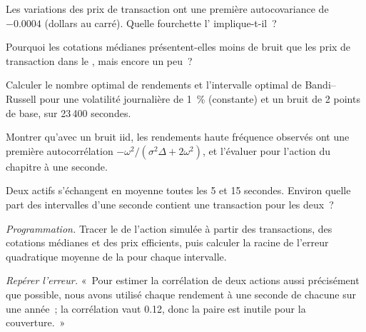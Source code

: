 \begin{exercise}[$\star$]\label{exo:qm:high-frequency-econometrics:2}
Les variations des prix de transaction ont une première autocovariance de $-0.0004$ (dollars au carré). Quelle fourchette l' implique-t-il~?
\end{exercise}

\begin{exercise}[$\star$]\label{exo:qm:high-frequency-econometrics:3}
Pourquoi les cotations médianes présentent-elles moins de bruit que les prix de transaction dans le , mais encore un peu~?
\end{exercise}

\begin{exercise}[$\star\star$]\label{exo:qm:high-frequency-econometrics:4}
Calculer le nombre optimal de rendements et l'intervalle optimal de Bandi--Russell pour une volatilité journalière de 1~\% (constante) et un bruit de 2 points de base, sur 23\,400 secondes.
\end{exercise}

\begin{exercise}[$\star\star$]\label{exo:qm:high-frequency-econometrics:5}
Montrer qu'avec un bruit iid, les rendements haute fréquence observés ont une première autocorrélation $-\omega^2/(\sigma^2\Delta + 2\omega^2)$, et l'évaluer pour l'action du chapitre à une seconde.
\end{exercise}

\begin{exercise}[$\star\star$]\label{exo:qm:high-frequency-econometrics:6}
Deux actifs s'échangent en moyenne toutes les 5 et 15 secondes. Environ quelle part des intervalles d'une seconde contient une transaction pour les deux~?
\end{exercise}

\begin{exercise}[$\star\star\star$]\label{exo:qm:high-frequency-econometrics:7}
\emph{Programmation.} Tracer le  de l'action simulée à partir des transactions, des cotations médianes et des prix efficients, puis calculer la racine de l'erreur quadratique moyenne de la  pour
chaque intervalle.
\end{exercise}

\begin{exercise}[$\star\star\star$]\label{exo:qm:high-frequency-econometrics:8}
\emph{Repérer l'erreur.} «~Pour estimer la corrélation de deux actions aussi précisément que possible, nous avons utilisé chaque rendement à une seconde de chacune sur une année~; la corrélation vaut 0.12,
donc la paire est inutile pour la couverture.~»
\end{exercise}


